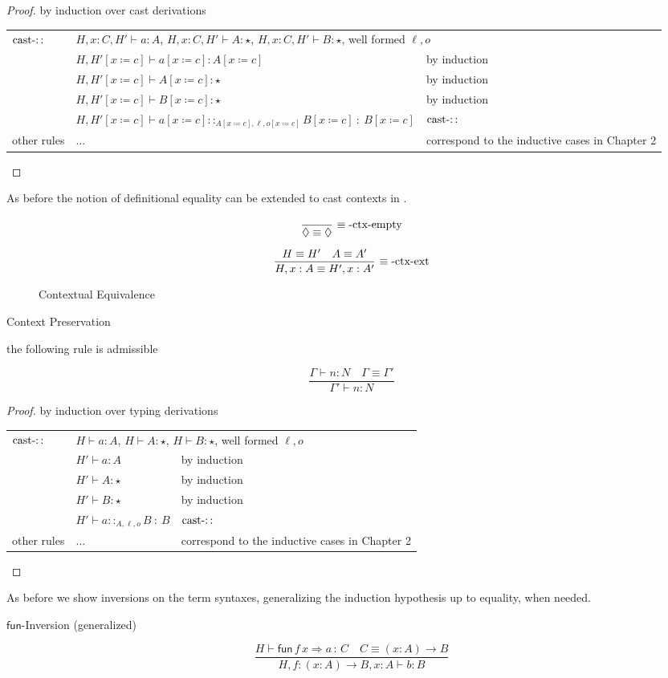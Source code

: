 \begin{proof}
by induction over cast derivations

\begin{tabular}{lll}
$\operatorname{cast-::}$ & \multicolumn{2}{l}{$H,x:C,H'\vdash a:A$, $H,x:C,H'\vdash A:\star$, $H,x:C,H'\vdash B:\star$, well formed $\ell ,o$}\tabularnewline
 & $H,H'\left[x\coloneqq c\right]\vdash a\left[x\coloneqq c\right]:A\left[x\coloneqq c\right]$ & by induction\tabularnewline
 & $H,H'\left[x\coloneqq c\right]\vdash A\left[x\coloneqq c\right]:\star$ & by induction\tabularnewline
 & $H,H'\left[x\coloneqq c\right]\vdash B\left[x\coloneqq c\right]:\star$ & by induction\tabularnewline
 & $H,H'\left[x\coloneqq c\right]\vdash a\left[x\coloneqq c\right]::_{A\left[x\coloneqq c\right],\ell ,o\left[x\coloneqq c\right]}B\left[x\coloneqq c\right]\::\:B\left[x\coloneqq c\right]$ & $\operatorname{cast-::}$\tabularnewline
other rules & ... & correspond to the inductive cases in Chapter 2\tabularnewline
\end{tabular}
\end{proof}
As before the notion of definitional equality can be extended to cast contexts in .

\begin{figure}
\[
\frac{\ }{\lozenge\equiv\lozenge}\,\rulename{\ensuremath{\equiv}-ctx-empty}
\]

\[
\frac{H\equiv H'\quad A\equiv A'}{H,x:A\equiv H',x:A'}\,\operatorname{\equiv-ctx-ext}
\]

\caption{Contextual Equivalence}
\label{fig:surface-Context-Equiv}
\end{figure}

\begin{lem}
Context Preservation

the following rule is admissible

\[
\frac{\Gamma\vdash n:N\quad\Gamma\equiv\Gamma'}{\Gamma'\vdash n:N}
\]
\end{lem}

\begin{proof}
by induction over typing derivations

\begin{tabular}{lll}
$\operatorname{cast-::}$ & \multicolumn{2}{l}{$H\vdash a:A$, $H\vdash A:\star$, $H\vdash B:\star$, well formed $\ell ,o$}\tabularnewline
 & $H'\vdash a:A$ & by induction\tabularnewline
 & $H'\vdash A:\star$ & by induction\tabularnewline
 & $H'\vdash B:\star$ & by induction\tabularnewline
 & $H'\vdash a::_{A,\ell ,o}B\::\:B$ & $\operatorname{cast-::}$\tabularnewline
other rules & ... & correspond to the inductive cases in Chapter 2\tabularnewline
\end{tabular}
\end{proof}
As before we show inversions on the term syntaxes, generalizing the induction hypothesis up to equality, when needed.
\begin{lem}
$\mathsf{fun}$-Inversion (generalized)

\[
\frac{H\vdash\mathsf{fun}\,f\,x\Rightarrow a\,:\,C\quad C\equiv\left(x:A\right)\rightarrow B}{H,f:\left(x:A\right)\rightarrow B,x:A\vdash b:B}
\]
\end{lem}


